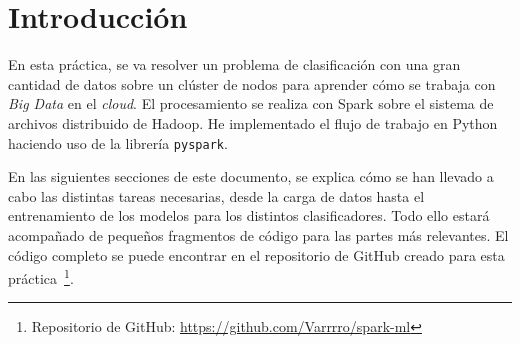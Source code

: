 \section{Introducción}

En esta práctica, se va resolver un problema de clasificación con una gran
cantidad de datos sobre un clúster de nodos para aprender cómo se trabaja con
\textit{Big Data} en el \textit{cloud}. El procesamiento se realiza con Spark
sobre el sistema de archivos distribuido de Hadoop. He implementado el flujo de
trabajo en Python haciendo uso de la librería \texttt{pyspark}.

En las siguientes secciones de este documento, se explica cómo se han llevado a
cabo las distintas tareas necesarias, desde la carga de datos hasta el
entrenamiento de los modelos para los distintos clasificadores. Todo ello estará
acompañado de pequeños fragmentos de código para las partes más relevantes. El
código completo se puede encontrar en el repositorio de GitHub creado para esta
práctica~\footnote{Repositorio de GitHub: \url{https://github.com/Varrrro/spark-ml}}.
